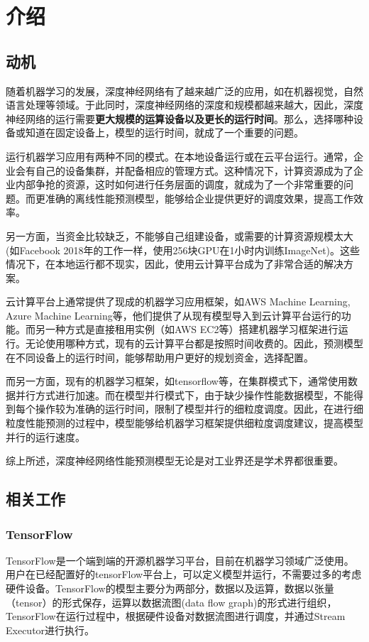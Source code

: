 \chapter{介绍}
\label{cha:intro}

\section{动机}
    随着机器学习的发展，深度神经网络有了越来越广泛的应用，如在机器视觉，自然语言处理等领域。于此同时，深度神经网络的深度和规模都越来越大，因此，深度神经网络的运行需要{\bfseries 更大规模的运算设备以及更长的运行时间}。那么，选择哪种设备或知道在固定设备上，模型的运行时间，就成了一个重要的问题。

    运行机器学习应用有两种不同的模式。在本地设备运行或在云平台运行。通常，企业会有自己的设备集群，并配备相应的管理方式。这种情况下，计算资源成为了企业内部争抢的资源，这时如何进行任务层面的调度，就成为了一个非常重要的问题。而更准确的离线性能预测模型，能够给企业提供更好的调度效果，提高工作效率。
    
    另一方面，当资金比较缺乏，不能够自己组建设备，或需要的计算资源规模太大(如Facebook 2018年的工作一样，使用256块GPU在1小时内训练ImageNet)。这些情况下，在本地运行都不现实，因此，使用云计算平台成为了非常合适的解决方案。
    
    云计算平台上通常提供了现成的机器学习应用框架，如AWS Machine Learning, Azure Machine Learning等，他们提供了从现有模型导入到云计算平台运行的功能。而另一种方式是直接租用实例（如AWS EC2等）搭建机器学习框架进行运行。无论使用哪种方式，现有的云计算平台都是按照时间收费的。因此，预测模型在不同设备上的运行时间，能够帮助用户更好的规划资金，选择配置。
    
    而另一方面，现有的机器学习框架，如tensorflow等，在集群模式下，通常使用数据并行方式进行加速。而在模型并行模式下，由于缺少操作性能数据模型，不能得到每个操作较为准确的运行时间，限制了模型并行的细粒度调度。因此，在进行细粒度性能预测的过程中，模型能够给机器学习框架提供细粒度调度建议，提高模型并行的运行速度。
    
    综上所述，深度神经网络性能预测模型无论是对工业界还是学术界都很重要。

\section{相关工作}
\label{sec:related}

\subsection{TensorFlow}
    TensorFlow是一个端到端的开源机器学习平台，目前在机器学习领域广泛使用。用户在已经配置好的tensorFlow平台上，可以定义模型并运行，不需要过多的考虑硬件设备。TensorFlow的模型主要分为两部分，数据以及运算，数据以张量（tensor）的形式保存，运算以数据流图(data flow graph)的形式进行组织，TensorFlow在运行过程中，根据硬件设备对数据流图进行调度，并通过Stream Executor进行执行。

